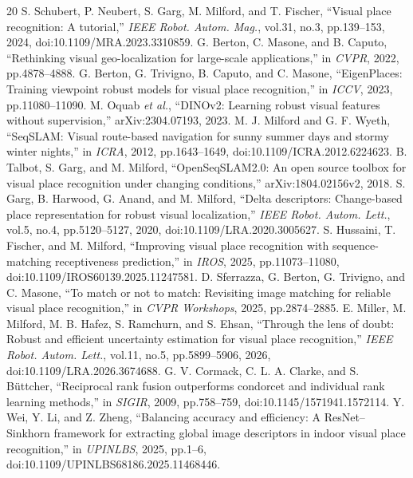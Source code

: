 \documentclass[conference]{IEEEtran}
\begin{document}
\clearpage
\begin{thebibliography}{20}
 S. Schubert, P. Neubert, S. Garg, M. Milford, and T. Fischer, ``Visual place recognition: A tutorial,'' \emph{IEEE Robot. Autom. Mag.}, vol.31, no.3, pp.139--153, 2024, doi:10.1109/MRA.2023.3310859.
 G. Berton, C. Masone, and B. Caputo, ``Rethinking visual geo-localization for large-scale applications,'' in \emph{CVPR}, 2022, pp.4878--4888.
 G. Berton, G. Trivigno, B. Caputo, and C. Masone, ``EigenPlaces: Training viewpoint robust models for visual place recognition,'' in \emph{ICCV}, 2023, pp.11080--11090.
 M. Oquab \emph{et al.}, ``DINOv2: Learning robust visual features without supervision,'' arXiv:2304.07193, 2023.
 M. J. Milford and G. F. Wyeth, ``SeqSLAM: Visual route-based navigation for sunny summer days and stormy winter nights,'' in \emph{ICRA}, 2012, pp.1643--1649, doi:10.1109/ICRA.2012.6224623.
 B. Talbot, S. Garg, and M. Milford, ``OpenSeqSLAM2.0: An open source toolbox for visual place recognition under changing conditions,'' arXiv:1804.02156v2, 2018.
 S. Garg, B. Harwood, G. Anand, and M. Milford, ``Delta descriptors: Change-based place representation for robust visual localization,'' \emph{IEEE Robot. Autom. Lett.}, vol.5, no.4, pp.5120--5127, 2020, doi:10.1109/LRA.2020.3005627.
 S. Hussaini, T. Fischer, and M. Milford, ``Improving visual place recognition with sequence-matching receptiveness prediction,'' in \emph{IROS}, 2025, pp.11073--11080, doi:10.1109/IROS60139.2025.11247581.
 D. Sferrazza, G. Berton, G. Trivigno, and C. Masone, ``To match or not to match: Revisiting image matching for reliable visual place recognition,'' in \emph{CVPR Workshops}, 2025, pp.2874--2885.
 E. Miller, M. Milford, M. B. Hafez, S. Ramchurn, and S. Ehsan, ``Through the lens of doubt: Robust and efficient uncertainty estimation for visual place recognition,'' \emph{IEEE Robot. Autom. Lett.}, vol.11, no.5, pp.5899--5906, 2026, doi:10.1109/LRA.2026.3674688.
 G. V. Cormack, C. L. A. Clarke, and S. B\"uttcher, ``Reciprocal rank fusion outperforms condorcet and individual rank learning methods,'' in \emph{SIGIR}, 2009, pp.758--759, doi:10.1145/1571941.1572114.
 Y. Wei, Y. Li, and Z. Zheng, ``Balancing accuracy and efficiency: A ResNet--Sinkhorn framework for extracting global image descriptors in indoor visual place recognition,'' in \emph{UPINLBS}, 2025, pp.1--6, doi:10.1109/UPINLBS68186.2025.11468446.

\end{thebibliography}
\end{document}
